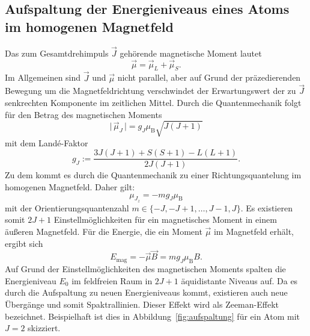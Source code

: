 \subsection{Aufspaltung der Energieniveaus eines Atoms im homogenen Magnetfeld}
Das zum Gesamtdrehimpuls $\vec{J}$ gehörende magnetische Moment lautet
\begin{equation}
    \vec{\mu}=\vec{\mu}_L+\vec{\mu}_S.
\end{equation}
Im Allgemeinen sind $\vec{J}$ und $\vec{\mu}$ nicht parallel, aber auf Grund der präzedierenden
Bewegung um die Magnetfeldrichtung verschwindet der Erwartungswert der zu $\vec{J}$
senkrechten Komponente im zeitlichen Mittel.
Durch die Quantenmechanik folgt für den Betrag des magnetischen Moments
\begin{equation}
     \lvert\,\vec{\mu}_J\,\rvert=g_J\mu_{\mathup{B}}\sqrt{J(J+1)}
\end{equation}
mit dem Landé-Faktor
\begin{equation}
    g_J:=\frac{3J(J+1)+S(S+1)-L(L+1)}{2J(J+1)}.
    \label{eq:g_J}
\end{equation}
Zu dem kommt es durch die Quantenmechanik zu einer Richtungsquantelung im homogenen
Magnetfeld. Daher gilt:
\begin{equation}
    \mu_{J_z}=-mg_J\mu_{\mathup{B}}
\end{equation}
mit der Orientierungsquantenzahl $m\in\{-J,-J+1,\ldots,J-1,J\}$.
Es existieren somit $2J+1$ Einstellmöglichkeiten für ein magnetisches Moment in einem äußeren
Magnetfeld.
Für die Energie, die ein Moment $\vec{\mu}$ im Magnetfeld erhält, ergibt sich
\begin{equation}
    E_{\mathup{mag}}=-\vec{\mu}\vec{B}=mg_J\mu_{\mathup{B}}B.
    \label{eq:E_mag}
\end{equation}
Auf Grund der Einstellmöglichkeiten des magnetischen Moments spalten die Energieniveau
$E_0$ im feldfreien Raum in $2J+1$ äquidistante Niveaus auf. Da es durch die Aufspaltung
zu neuen Energieniveaus kommt, existieren auch neue Übergänge und somit Spaktrallinien.
Dieser Effekt wird als Zeeman-Effekt bezeichnet.
Beispielhaft ist dies in Abbildung~\ref{fig:aufspaltung} für ein Atom mit $J=2$
skizziert.
